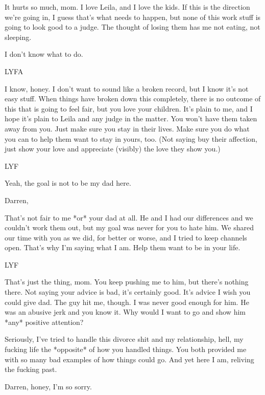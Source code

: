 It hurts so much, mom. I love Leila, and I love the kids. If this is the direction we're going in, I guess that's what needs to happen, but none of this work stuff is going to look good to a judge. The thought of losing them has me not eating, not sleeping.

I don't know what to do.

LYFA

\secdiv{}

\noindent I know, honey. I don't want to sound like a broken record, but I know it's not easy stuff. When things have broken down this completely, there is no outcome of this that is going to feel fair, but you love your children. It's plain to me, and I hope it's plain to Leila and any judge in the matter. You won't have them taken away from you. Just make sure you stay in their lives. Make sure you do what you can to help them want to stay in yours, too. (Not saying buy their affection, just show your love and appreciate (visibly) the love they show you.)

LYF

\secdiv{}

\noindent Yeah, the goal is not to be my dad here.

\secdiv{}

\noindent Darren,

That's not fair to me *or* your dad at all. He and I had our differences and we couldn't work them out, but my goal was never for you to hate him. We shared our time with you as we did, for better or worse, and I tried to keep channels open. That's why I'm saying what I am. Help them want to be in your life.

LYF

\secdiv{}

\noindent That's just the thing, mom. You keep pushing me to him, but there's nothing there. Not saying your advice is bad, it's certainly good. It's advice I wish you could give dad. The guy hit me, though. I was never good enough for him. He was an abusive jerk and you know it. Why would I want to go and show him *any* positive attention?

Seriously, I've tried to handle this divorce shit and my relationship, hell, my fucking life the *opposite* of how you handled things. You both provided me with so many bad examples of how things could go. And yet here I am, reliving the fucking past.

\secdiv{}

\noindent Darren, honey, I'm so sorry.

